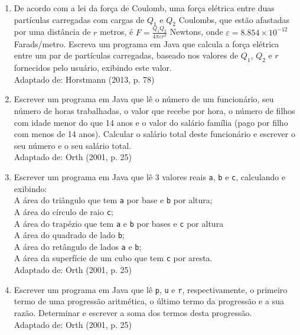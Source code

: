 \documentclass[onecolumn,a4paper,10pt]{report}
\newcommand{\+}{\, + \,}
\newcommand{\<}{\hspace*{-0.4cm}}
\begin{document}
\begin{enumerate}[1.]
\item De acordo com a lei da força de Coulomb, uma força elétrica entre duas partículas carregadas com cargas de $Q_1$ e $Q_2$ Coulombs, que estão afastadas por uma distância de $r$ metros, é $F = \frac{Q_1Q_2}{4\pi \varepsilon r^2}$ Newtons, onde $\varepsilon = 8.854 \times 10^{-12}$ Farads/metro. Escreva um programa em Java que calcula a força elétrica entre um par de partículas carregadas, baseado nos valores de $Q_1$, $Q_2$ e $r$ fornecidos pelo usuário, exibindo este valor.\\
{\tiny Adaptado de: Horstmann (2013, p. 78)}

\item Escrever um programa em Java que lê o número de um funcionário, seu número de horas trabalhadas, o valor que recebe por hora, o número de filhos com idade menor do que 14 anos e o valor do salário família (pago por filho com menos de 14 anos). Calcular o salário total deste funcionário e escrever o seu número e o seu salário total.\\
{\tiny Adaptado de: Orth (2001, p. 25)}

\item Escrever um programa em Java que lê 3 valores reais \texttt{a}, \texttt{b} e \texttt{c}, calculando e exibindo:\\
A área do triângulo que tem \texttt{a} por base e \texttt{b} por altura;\\
A área do círculo de raio \texttt{c};\\
A área do trapézio que tem \texttt{a} e \texttt{b} por bases e \texttt{c} por altura\\
A área do quadrado de lado \texttt{b};\\
A área do retângulo de lados \texttt{a} e \texttt{b};\\
A área da superfície de um cubo que tem \texttt{c} por aresta.\\
{\tiny Adaptado de: Orth (2001, p. 25)}

\item Escrever um programa em Java que lê \texttt{p}, \texttt{u} e \texttt{r}, respectivamente, o primeiro termo de uma progressão aritmética, o último termo da progressão e a sua razão. Determinar e escrever a soma dos termos desta progressão.\\
{\tiny Adaptado de: Orth (2001, p. 25)}


\end{enumerate}
\end{document}
